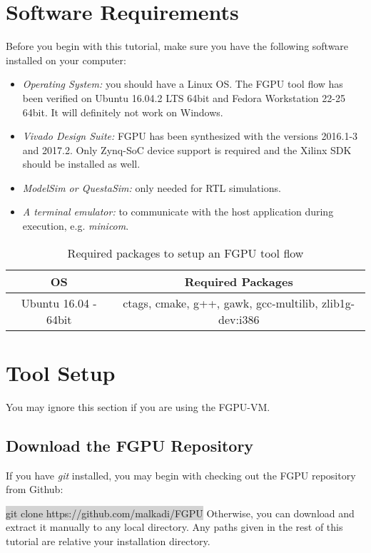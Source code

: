 \documentclass[11pt]{article}
\begin{document}
\section{Software Requirements}
Before you begin with this tutorial, 
make sure you have the following software installed on your computer:
\begin{itemize}
  \item \emph{Operating System:} you should have a Linux OS.
    The FGPU tool flow has been verified on Ubuntu 16.04.2 LTS 64bit and Fedora Workstation 22-25 64bit.
    It will definitely not work on Windows.
  \item \emph{Vivado Design Suite:} FGPU has been synthesized with the versions 2016.1-3 and 2017.2.
    Only Zynq-SoC device support is required and the Xilinx SDK should be installed as well.
  \item \emph{ModelSim or QuestaSim:}
    only needed for RTL simulations.
  \item \emph{A terminal emulator:} to communicate with the host application during execution, e.g. \emph{minicom}.
\end{itemize}

\begin{table}[t]
  \centering
  \caption{Required packages to setup an FGPU tool flow}
  \label{tab:packages}
  \begin{tabular}{c|c}
    OS    & Required Packages \\ \hline
    Ubuntu 16.04 - 64bit & ctags, cmake, g++, gawk, gcc-multilib, zlib1g-dev:i386\\ \hline
  \end{tabular}
  
\end{table}

\section{Tool Setup}
You may ignore this section if you are using the FGPU-VM.

\subsection{Download the FGPU Repository}
If you have \emph{git} installed, you may begin with checking out the FGPU repository from Github:

\centering \colorbox{lightGray}{ git clone https://github.com/malkadi/FGPU}
\justify
Otherwise, you can download and extract it manually to any local directory.
Any paths given in the rest of this tutorial are relative your installation directory.
\end{document}
